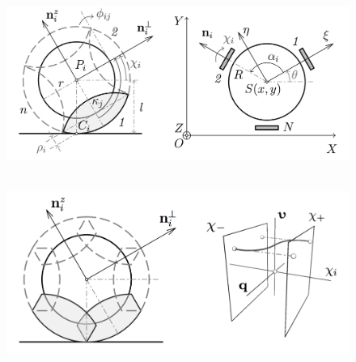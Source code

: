 \begin{figure}[H]
    \hspace{-15pt}
    \includegraphics[scale=0.25]{./pic/pic_wheel_cart_300.png}
    \caption{\ }
    \label{fig:wheel}
\end{figure}

\begin{figure}[H]
    \hspace{25pt}
    \includegraphics[scale=0.25]{./pic/pic_overlap_change_300.png}
    \caption{\ }
    \label{fig:overlap_and_change}
\end{figure}
